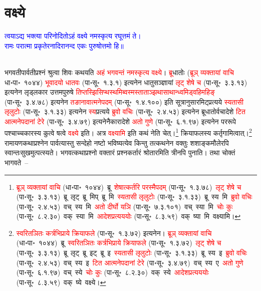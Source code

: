 \section[वक्ष्ये]{वक्ष्ये}
\centering\textcolor{blue}{त्वयाऽद्य भक्त्या परिनोदितोऽहं वक्ष्ये नमस्कृत्य रघूत्तमं ते।\nopagebreak\\
रामः परात्मा प्रकृतेरनादिरानन्द एकः पुरुषोत्तमो हि॥}\nopagebreak\\
\\
\fontsize{14}{21}\selectfont\begin{sloppypar}\justifying\noindent\hspace{10mm}
भगवती\-पार्वती\-प्रश्नं श्रुत्वा शिवः कथयति \textcolor{red}{अहं भगवन्तं नमस्कृत्य वक्ष्ये}। \textcolor{red}{ब्रू}\-धातोः (\textcolor{red}{ब्रूञ् व्यक्तायां वाचि} धा॰पा॰~१०४४) \textcolor{red}{भूवादयो धातवः} (पा॰सू॰~१.३.१) इत्यनेन धातु\-सञ्ज्ञायां \textcolor{red}{लृट् शेषे च} (पा॰सू॰~३.३.१३) इत्यनेन लृड्लकार उत्तम\-पुरुषे \textcolor{red}{तिप्तस्झि\-सिप्थस्थ\-मिब्वस्मस्ताताञ्झ\-थासाथान्ध्वमिड्वहिमहिङ्} (पा॰सू॰~३.४.७८) इत्यनेन \textcolor{red}{तङानावात्मने\-पदम्} (पा॰सू॰~१.४.१००) इति सूत्रानुसारमिट्प्रत्यये \textcolor{red}{स्यतासी लृलुटोः} (पा॰सू॰~३.१.३३) इत्यनेन \textcolor{red}{स्य}\-प्रत्यये \textcolor{red}{ब्रुवो वचिः} (पा॰सू॰~२.४.५३) इत्यनेन ब्रू\-धातोर्वचादेशे \textcolor{red}{टित आत्मने\-पदानां टेरे} (पा॰सू॰~३.४.७९) इत्यनेनैकारादेशे \textcolor{red}{अतो गुणे} (पा॰सू॰~६.१.९७) इत्यनेन पररूपे पश्चाच्चकारस्य कुत्वे षत्वे \textcolor{red}{वक्ष्ये} इति। अत्र \textcolor{red}{वक्ष्यामि} इति कथं नेति चेत्।\footnote{\textcolor{red}{ब्रूञ् व्यक्तायां वाचि} (धा॰पा॰~१०४४)~\arrow ब्रू~\arrow \textcolor{red}{शेषात्कर्तरि परस्मैपदम्} (पा॰सू॰~१.३.७८)~\arrow \textcolor{red}{लृट् शेषे च} (पा॰सू॰~३.३.१३)~\arrow ब्रू~लृट्~\arrow ब्रू~मिप्~\arrow ब्रू~मि~\arrow \textcolor{red}{स्यतासी लृलुटोः} (पा॰सू॰~३.१.३३)~\arrow ब्रू~स्य~मि~\arrow \textcolor{red}{ब्रुवो वचिः} (पा॰सू॰~२.४.५३)~\arrow वच्~स्य~मि~\arrow \textcolor{red}{अतो दीर्घो यञि} (पा॰सू॰~७.३.१०१)~\arrow वच्~स्या~मि~\arrow \textcolor{red}{चोः कुः} (पा॰सू॰~८.२.३०)~\arrow वक्~स्या~मि~\arrow \textcolor{red}{आदेश\-प्रत्यययोः} (पा॰सू॰~८.३.५९)~\arrow वक्~ष्या~मि~\arrow वक्ष्यामि।} क्रिया\-फलस्य कर्तृ\-गामित्वात्।\footnote{\textcolor{red}{स्वरितञितः कर्त्रभिप्राये क्रियाफले} (पा॰सू॰~१.३.७२) इत्यनेन। \textcolor{red}{ब्रूञ् व्यक्तायां वाचि} (धा॰पा॰~१०४४)~\arrow ब्रू~\arrow \textcolor{red}{स्वरितञितः कर्त्रभिप्राये क्रियाफले} (पा॰सू॰~१.३.७२)~\arrow \textcolor{red}{लृट् शेषे च} (पा॰सू॰~३.३.१३)~\arrow ब्रू~लृट्~\arrow ब्रू~इट्~\arrow ब्रू~इ~\arrow \textcolor{red}{स्यतासी लृलुटोः} (पा॰सू॰~३.१.३३)~\arrow ब्रू~स्य~इ~\arrow \textcolor{red}{ब्रुवो वचिः} (पा॰सू॰~२.४.५३)~\arrow वच्~स्य~इ~\arrow \textcolor{red}{टित आत्मने\-पदानां टेरे} (पा॰सू॰~३.४.७९)~\arrow वच्~स्य~ए~\arrow \textcolor{red}{अतो गुणे} (पा॰सू॰~६.१.९७)~\arrow वच्~स्ये~\arrow \textcolor{red}{चोः कुः} (पा॰सू॰~८.२.३०)~\arrow वक्~स्ये~\arrow \textcolor{red}{आदेश\-प्रत्यययोः} (पा॰सू॰~८.३.५९)~\arrow वक्~ष्ये~\arrow वक्ष्ये।} रामायण\-कथा\-प्रश्नेन पार्वत्यास्तु सन्देहो नष्टो भविष्यत्येव किन्तु तत्कथनेन वक्तुः शशाङ्क\-मौलेरपि स्वान्तः\-सुखमुत्पत्स्यते। भगवत्कथा\-प्रश्नो वक्तारं प्रश्न\-कर्तारं श्रोतारमिति त्रीनपि पुनाति। तथा चोक्तं भागवते~–\end{sloppypar}
